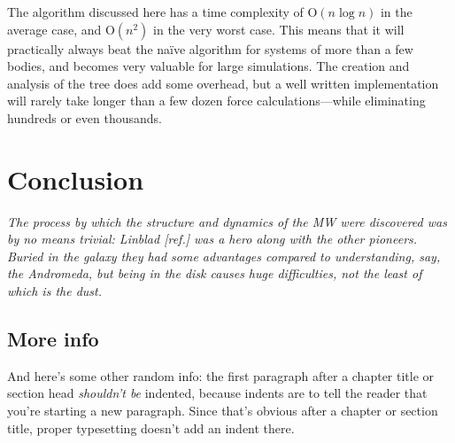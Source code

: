 \documentclass[12pt,twoside]{reedthesis}
\begin{document}
The algorithm discussed here has a time complexity of O$(n \log n)$ in the average case, and O$(n^2)$ in the very worst case. This means that it will practically always beat the na\"ive algorithm for systems of more than a few bodies, and becomes very valuable for large simulations. The creation and analysis of the tree does add some overhead, but a well written implementation will rarely take longer than a few dozen force calculations---while eliminating hundreds or even thousands.



\chapter*{Conclusion}
	\setcounter{chapter}{4}
	\setcounter{section}{0}

\emph{The process by which the structure and dynamics of the MW were discovered was by no means trivial: Linblad [ref.] was a hero along with the other pioneers.  Buried in the galaxy they had some advantages compared to understanding, say, the Andromeda, but being in the disk causes huge difficulties, not the least of which is the dust.}

\section{More info}
And here's some other random info: the first paragraph after a chapter title or section head \emph{shouldn't be} indented, because indents are to tell the reader that you're starting a new paragraph. Since that's obvious after a chapter or section title, proper typesetting doesn't add an indent there.
\end{document}
